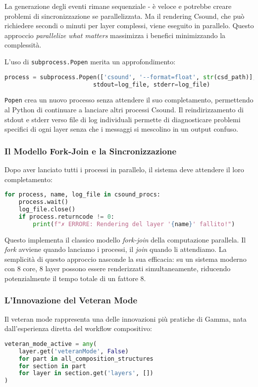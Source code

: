La generazione degli eventi rimane sequenziale - è veloce e potrebbe creare problemi di sincronizzazione se parallelizzata. Ma il rendering Csound, che può richiedere secondi o minuti per layer complessi, viene eseguito in parallelo. Questo approccio \textit{parallelize what matters} massimizza i benefici minimizzando la complessità.

L'uso di \texttt{subprocess.Popen} merita un approfondimento:

\begin{lstlisting}[language=Python]
process = subprocess.Popen(['csound', '--format=float', str(csd_path)], 
                         stdout=log_file, stderr=log_file)
\end{lstlisting}

\texttt{Popen} crea un nuovo processo senza attendere il suo completamento, permettendo al Python di continuare a lanciare altri processi Csound. Il reindirizzamento di stdout e stderr verso file di log individuali permette di diagnosticare problemi specifici di ogni layer senza che i messaggi si mescolino in un output confuso.
\subsubsection{Il Modello Fork-Join e la Sincronizzazione}
Dopo aver lanciato tutti i processi in parallelo, il sistema deve attendere il loro completamento:

\begin{lstlisting}[language=Python]
for process, name, log_file in csound_procs:
    process.wait()
    log_file.close()
    if process.returncode != 0:
        print(f"✗ ERRORE: Rendering del layer '{name}' fallito!")
\end{lstlisting}

Questo implementa il classico modello \textit{fork-join} della computazione parallela. Il \textit{fork} avviene quando lanciamo i processi, il \textit{join} quando li attendiamo. La semplicità di questo approccio nasconde la sua efficacia: su un sistema moderno con 8 core, 8 layer possono essere renderizzati simultaneamente, riducendo potenzialmente il tempo totale di un fattore 8.
\subsubsection{L'Innovazione del Veteran Mode}
Il veteran mode rappresenta una delle innovazioni più pratiche di Gamma, nata dall'esperienza diretta del workflow compositivo:

\begin{lstlisting}[language=Python]
veteran_mode_active = any(
    layer.get('veteranMode', False)
    for part in all_composition_structures
    for section in part
    for layer in section.get('layers', [])
)
\end{lstlisting}

